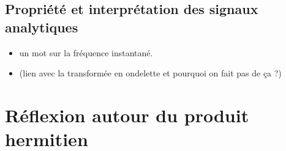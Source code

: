 \subsection{Propriété et interprétation des signaux analytiques}

\begin{itemize}
		
	\item un mot sur la fréquence instantané.
	
	\item (lien avec la transformée en ondelette et pourquoi on fait pas de ça ?)

\end{itemize}




\section{Réflexion autour du produit hermitien}


